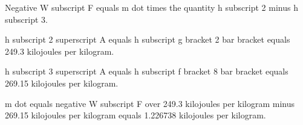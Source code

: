 Negative W subscript F equals m dot times the quantity h subscript 2 minus h subscript 3.

h subscript 2 superscript A equals h subscript g bracket 2 bar bracket equals 249.3 kilojoules per kilogram.

h subscript 3 superscript A equals h subscript f bracket 8 bar bracket equals 269.15 kilojoules per kilogram.

m dot equals negative W subscript F over 249.3 kilojoules per kilogram minus 269.15 kilojoules per kilogram equals 1.226738 kilojoules per kilogram.